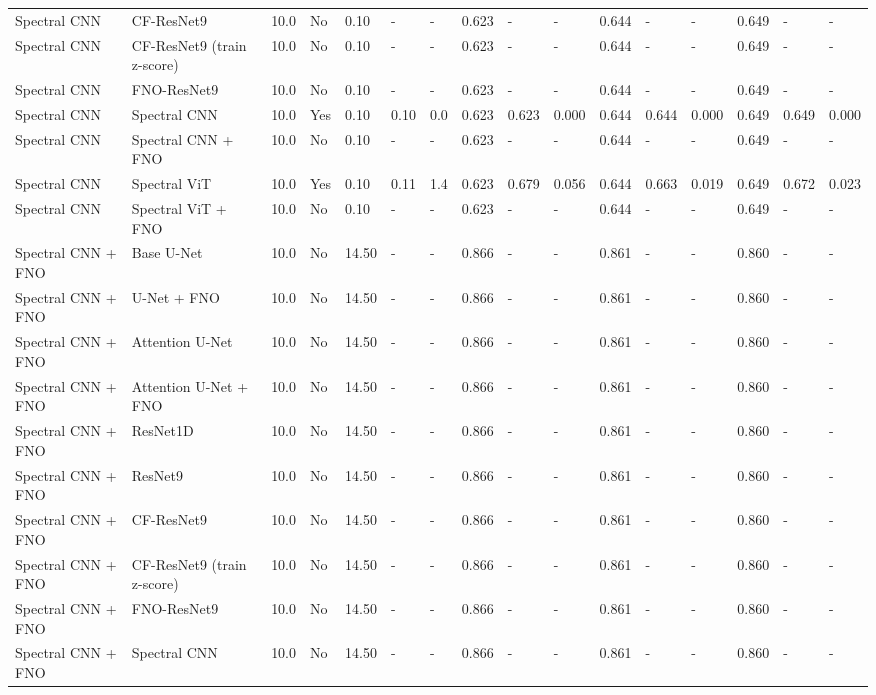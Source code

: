 \begin{longtable}{llllllllllllllll}
Spectral CNN & CF-ResNet9 & 10.0 & No & 0.10 & - & - & 0.623 & - & - & 0.644 & - & - & 0.649 & - & - \\
Spectral CNN & CF-ResNet9 (train z-score) & 10.0 & No & 0.10 & - & - & 0.623 & - & - & 0.644 & - & - & 0.649 & - & - \\
Spectral CNN & FNO-ResNet9 & 10.0 & No & 0.10 & - & - & 0.623 & - & - & 0.644 & - & - & 0.649 & - & - \\
Spectral CNN & Spectral CNN & 10.0 & Yes & 0.10 & 0.10 & 0.0 & 0.623 & 0.623 & 0.000 & 0.644 & 0.644 & 0.000 & 0.649 & 0.649 & 0.000 \\
Spectral CNN & Spectral CNN + FNO & 10.0 & No & 0.10 & - & - & 0.623 & - & - & 0.644 & - & - & 0.649 & - & - \\
Spectral CNN & Spectral ViT & 10.0 & Yes & 0.10 & 0.11 & 1.4 & 0.623 & 0.679 & 0.056 & 0.644 & 0.663 & 0.019 & 0.649 & 0.672 & 0.023 \\
Spectral CNN & Spectral ViT + FNO & 10.0 & No & 0.10 & - & - & 0.623 & - & - & 0.644 & - & - & 0.649 & - & - \\
Spectral CNN + FNO & Base U-Net & 10.0 & No & 14.50 & - & - & 0.866 & - & - & 0.861 & - & - & 0.860 & - & - \\
Spectral CNN + FNO & U-Net + FNO & 10.0 & No & 14.50 & - & - & 0.866 & - & - & 0.861 & - & - & 0.860 & - & - \\
Spectral CNN + FNO & Attention U-Net & 10.0 & No & 14.50 & - & - & 0.866 & - & - & 0.861 & - & - & 0.860 & - & - \\
Spectral CNN + FNO & Attention U-Net + FNO & 10.0 & No & 14.50 & - & - & 0.866 & - & - & 0.861 & - & - & 0.860 & - & - \\
Spectral CNN + FNO & ResNet1D & 10.0 & No & 14.50 & - & - & 0.866 & - & - & 0.861 & - & - & 0.860 & - & - \\
Spectral CNN + FNO & ResNet9 & 10.0 & No & 14.50 & - & - & 0.866 & - & - & 0.861 & - & - & 0.860 & - & - \\
Spectral CNN + FNO & CF-ResNet9 & 10.0 & No & 14.50 & - & - & 0.866 & - & - & 0.861 & - & - & 0.860 & - & - \\
Spectral CNN + FNO & CF-ResNet9 (train z-score) & 10.0 & No & 14.50 & - & - & 0.866 & - & - & 0.861 & - & - & 0.860 & - & - \\
Spectral CNN + FNO & FNO-ResNet9 & 10.0 & No & 14.50 & - & - & 0.866 & - & - & 0.861 & - & - & 0.860 & - & - \\
Spectral CNN + FNO & Spectral CNN & 10.0 & No & 14.50 & - & - & 0.866 & - & - & 0.861 & - & - & 0.860 & - & - \\

\end{longtable}

